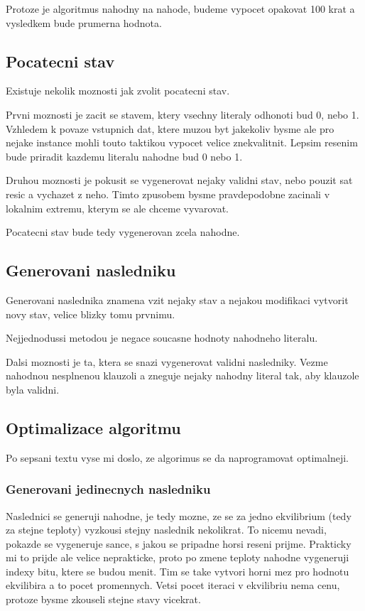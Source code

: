 \documentclass[12pt,a4paper]{article}
\begin{document}
Protoze je algoritmus nahodny na nahode, budeme vypocet opakovat 100 krat a vysledkem bude prumerna hodnota.


\subsection{Pocatecni stav}
Existuje nekolik moznosti jak zvolit pocatecni stav.

Prvni moznosti je zacit se stavem, ktery vsechny literaly odhonoti bud 0, nebo 1. Vzhledem k povaze vstupnich dat, ktere muzou byt jakekoliv bysme ale pro nejake instance mohli touto taktikou vypocet velice znekvalitnit. Lepsim resenim bude priradit kazdemu literalu nahodne bud 0 nebo 1.

Druhou moznosti je pokusit se vygenerovat nejaky validni stav, nebo pouzit sat resic a vychazet z neho. Timto zpusobem bysme pravdepodobne zacinali v lokalnim extremu, kterym se ale chceme vyvarovat.

Pocatecni stav bude tedy vygenerovan zcela nahodne.

\subsection{Generovani nasledniku}
Generovani naslednika znamena vzit nejaky stav a nejakou modifikaci vytvorit novy stav, velice blizky tomu prvnimu.

Nejjednodussi metodou je negace soucasne hodnoty nahodneho literalu.

Dalsi moznosti je ta, ktera se snazi vygenerovat validni nasledniky. Vezme nahodnou nesplnenou klauzoli a zneguje nejaky nahodny literal tak, aby klauzole byla validni.


\subsection{Optimalizace algoritmu}

Po sepsani textu vyse mi doslo, ze algorimus se da naprogramovat optimalneji. 

\subsubsection{Generovani jedinecnych nasledniku}

Naslednici se generuji nahodne, je tedy mozne, ze se za jedno ekvilibrium (tedy za stejne teploty) vyzkousi stejny naslednik nekolikrat. To nicemu nevadi, pokazde se vygeneruje sance, s jakou se pripadne horsi reseni prijme. Prakticky mi to prijde ale velice neprakticke, proto po zmene teploty nahodne vygeneruji indexy bitu, ktere se budou menit. Tim se take vytvori horni mez pro hodnotu ekvilibira a to pocet promennych. Vetsi pocet iteraci v ekvilibriu nema cenu, protoze bysme zkouseli stejne stavy vicekrat.
\end{document}
